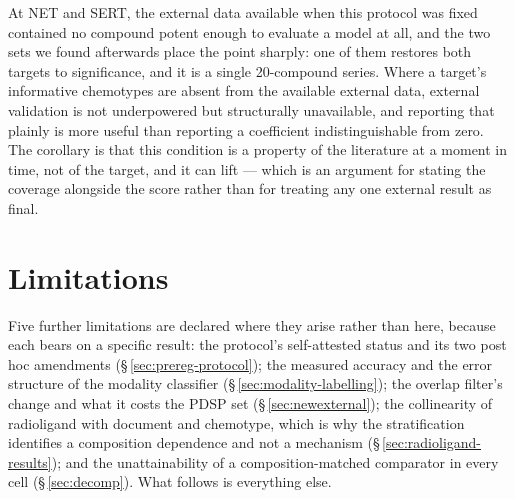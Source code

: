 \documentclass[11pt,a4paper]{article}
\begin{document}
At NET and SERT, the external data available when this protocol was fixed contained
no compound potent enough to evaluate a model at all, and the two sets we found
afterwards place the point sharply: one of them restores both targets to significance,
and it is a single 20-compound series. Where a target's informative chemotypes are
absent from the available external data, external validation is not underpowered but
structurally unavailable, and reporting that plainly is more useful than reporting a
coefficient indistinguishable from zero. The corollary is that this condition is a
property of the literature at a moment in time, not of the target, and it can lift ---
which is an argument for stating the coverage alongside the score rather than for
treating any one external result as final.

\section{Limitations}

Five further limitations are declared where they arise rather than here, because each
bears on a specific result: the protocol's self-attested status and its two post hoc
amendments (\S\,\ref{sec:prereg-protocol}); the measured accuracy and the error structure
of the modality classifier (\S\,\ref{sec:modality-labelling}); the overlap filter's
change and what it costs the PDSP set (\S\,\ref{sec:newexternal}); the collinearity of
radioligand with document and chemotype, which is why the stratification identifies a
composition dependence and not a mechanism (\S\,\ref{sec:radioligand-results}); and the
unattainability of a composition-matched comparator in every cell (\S\,\ref{sec:decomp}).
What follows is everything else.
\end{document}
